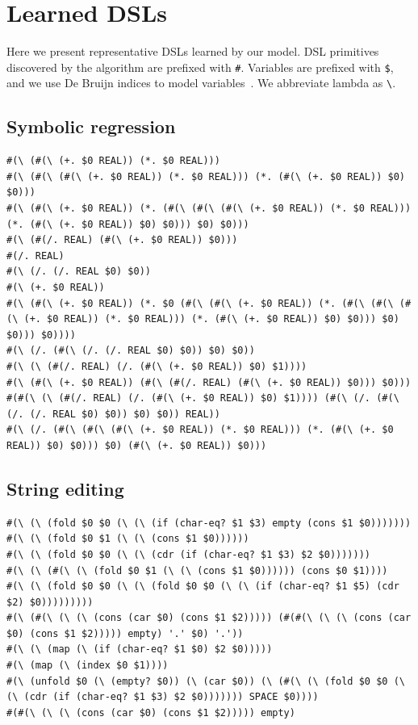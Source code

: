 \documentclass{article}
\begin{document}
\section{Learned DSLs}

Here we present representative DSLs learned by
our model. DSL primitives discovered by the algorithm are prefixed with
\lstinline!#!.
Variables are prefixed with \lstinline!$!, and we use De Bruijn indices to model variables~\cite{pierce}.
We abbreviate lambda as \lstinline!\!.

\pagebreak
\onecolumn
\subsection{Symbolic regression}
\begin{lstlisting}
#(\ (#(\ (+. $0 REAL)) (*. $0 REAL)))
#(\ (#(\ (#(\ (+. $0 REAL)) (*. $0 REAL))) (*. (#(\ (+. $0 REAL)) $0) $0)))
#(\ (#(\ (+. $0 REAL)) (*. (#(\ (#(\ (#(\ (+. $0 REAL)) (*. $0 REAL))) (*. (#(\ (+. $0 REAL)) $0) $0))) $0) $0)))
#(\ (#(/. REAL) (#(\ (+. $0 REAL)) $0)))
#(/. REAL)
#(\ (/. (/. REAL $0) $0))
#(\ (+. $0 REAL))
#(\ (#(\ (+. $0 REAL)) (*. $0 (#(\ (#(\ (+. $0 REAL)) (*. (#(\ (#(\ (#(\ (+. $0 REAL)) (*. $0 REAL))) (*. (#(\ (+. $0 REAL)) $0) $0))) $0) $0))) $0))))
#(\ (/. (#(\ (/. (/. REAL $0) $0)) $0) $0))
#(\ (\ (#(/. REAL) (/. (#(\ (+. $0 REAL)) $0) $1))))
#(\ (#(\ (+. $0 REAL)) (#(\ (#(/. REAL) (#(\ (+. $0 REAL)) $0))) $0)))
#(#(\ (\ (#(/. REAL) (/. (#(\ (+. $0 REAL)) $0) $1)))) (#(\ (/. (#(\ (/. (/. REAL $0) $0)) $0) $0)) REAL))
#(\ (/. (#(\ (#(\ (#(\ (+. $0 REAL)) (*. $0 REAL))) (*. (#(\ (+. $0 REAL)) $0) $0))) $0) (#(\ (+. $0 REAL)) $0)))
\end{lstlisting}

\subsection{String editing}
\begin{lstlisting}
#(\ (\ (fold $0 $0 (\ (\ (if (char-eq? $1 $3) empty (cons $1 $0)))))))
#(\ (\ (fold $0 $1 (\ (\ (cons $1 $0))))))
#(\ (\ (fold $0 $0 (\ (\ (cdr (if (char-eq? $1 $3) $2 $0)))))))
#(\ (\ (#(\ (\ (fold $0 $1 (\ (\ (cons $1 $0)))))) (cons $0 $1))))
#(\ (\ (fold $0 $0 (\ (\ (fold $0 $0 (\ (\ (if (char-eq? $1 $5) (cdr $2) $0)))))))))
#(\ (#(\ (\ (\ (cons (car $0) (cons $1 $2))))) (#(#(\ (\ (\ (cons (car $0) (cons $1 $2))))) empty) '.' $0) '.'))
#(\ (\ (map (\ (if (char-eq? $1 $0) $2 $0)))))
#(\ (map (\ (index $0 $1))))
#(\ (unfold $0 (\ (empty? $0)) (\ (car $0)) (\ (#(\ (\ (fold $0 $0 (\ (\ (cdr (if (char-eq? $1 $3) $2 $0))))))) SPACE $0))))
#(#(\ (\ (\ (cons (car $0) (cons $1 $2))))) empty)
\end{lstlisting}
\end{document}
